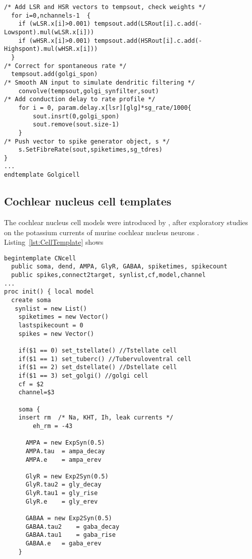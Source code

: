 \begin{appendix}
\begin{lstlisting}[label=GolgiTemplate,caption=Create golgi cell rate vector within Golgi template (in CNcell.tem)]
/* Add LSR and HSR vectors to tempsout, check weights */
  for i=0,nchannels-1  {
    if (wLSR.x[i]>0.001) tempsout.add(LSRout[i].c.add(-Lowspont).mul(wLSR.x[i]))
    if (wHSR.x[i]>0.001) tempsout.add(HSRout[i].c.add(-Highspont).mul(wHSR.x[i]))
  }
/* Correct for spontaneous rate */
  tempsout.add(golgi_spon)
/* Smooth AN input to simulate dendritic filtering */
    convolve(tempsout,golgi_synfilter,sout)
/* Add conduction delay to rate profile */
    for i = 0, param.delay.x[lsr][glg]*sg_rate/1000{
        sout.insrt(0,golgi_spon)
        sout.remove(sout.size-1)
    }
/* Push vector to spike generator object, s */
    s.SetFibreRate(sout,spiketimes,sg_tdres)
}
...
endtemplate Golgicell
\end{lstlisting}


\subsection{Cochlear nucleus cell templates}

The cochlear nucleus cell models were introduced by \citet{RothmanManis:2003b}, after exploratory studies on the potassium currents of murine cochlear nucleus neurons \citep{RothmanManis:2003,RothmanManis:2003a}. Listing~\ref{lst:CellTemplate}  shows 

\begin{lstlisting}[label=lst:CellTemplate,caption=Rothman and Manis cochlear nucleus cell template (in CNcell.tem)]
begintemplate CNcell
  public soma, dend, AMPA, GlyR, GABAA, spiketimes, spikecount
  public spikes,connect2target, synlist,cf,model,channel
...
proc init() { local model
  create soma
   synlist = new List()
    spiketimes = new Vector()
    lastspikecount = 0
    spikes = new Vector()
    
    if($1 == 0) set_tstellate() //Tstellate cell
    if($1 == 1) set_tuberc() //Tubervuloventral cell
    if($1 == 2) set_dstellate() //Dstellate cell
    if($1 == 3) set_golgi() //golgi cell
    cf = $2
    channel=$3

    soma {
	insert rm  /* Na, KHT, Ih, leak currents */
        eh_rm = -43 

      AMPA = new ExpSyn(0.5)
      AMPA.tau  = ampa_decay
      AMPA.e 	= ampa_erev

      GlyR = new Exp2Syn(0.5)
      GlyR.tau2	= gly_decay
      GlyR.tau1	= gly_rise
      GlyR.e 	= gly_erev

      GABAA = new Exp2Syn(0.5)
      GABAA.tau2 	= gaba_decay
      GABAA.tau1 	= gaba_rise
      GABAA.e 	= gaba_erev
    }



\end{lstlisting}
\end{appendix}

